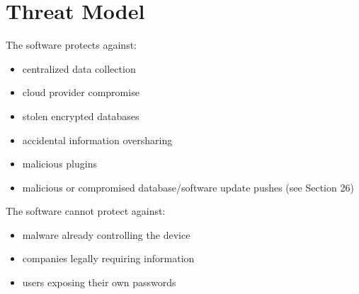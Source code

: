 
\chapter{Threat Model}

The software protects against:
\begin{itemize}
	\item centralized data collection
	\item cloud provider compromise
	\item stolen encrypted databases
	\item accidental information oversharing
	\item malicious plugins
	\item malicious or compromised database/software update pushes (see Section 26)
\end{itemize}


The software cannot protect against:
\begin{itemize}
	\item malware already controlling the device
	\item companies legally requiring information
	\item users exposing their own passwords
\end{itemize}

\sentinelchapterend
